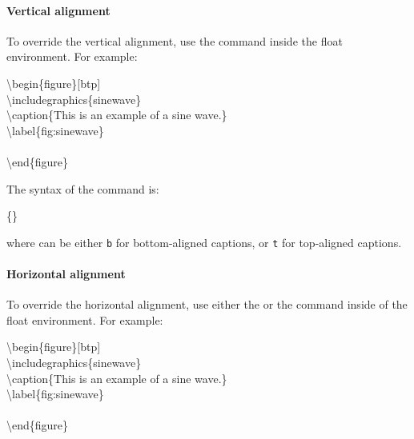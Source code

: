 \paragraph{Vertical alignment} To override the vertical alignment, use the
 command inside the float environment.  For
example:

\begin{fullwidth}
\begin{docspec}
  \textbackslash begin\{figure\}[btp]\\
  \qquad \textbackslash includegraphics\{sinewave\}\\
  \qquad \textbackslash caption\{This is an example of a sine wave.\}\\
  \qquad \textbackslash label\{fig:sinewave\}\\
  \qquad {}\\
  \textbackslash end\{figure\}
\end{docspec}
\end{fullwidth}

\noindent The syntax of the  command is:

\begin{docspec}
  \{\}
\end{docspec}

\noindent where  can be either \texttt{b} for bottom-aligned
captions, or \texttt{t} for top-aligned captions.

\paragraph{Horizontal alignment}\label{par:overriding-horizontal}
To override the horizontal alignment, use either the 
or the  command inside of the float environment.  For
example:

\begin{fullwidth}
\begin{docspec}
  \textbackslash begin\{figure\}[btp]\\
  \qquad \textbackslash includegraphics\{sinewave\}\\
  \qquad \textbackslash caption\{This is an example of a sine wave.\}\\
  \qquad \textbackslash label\{fig:sinewave\}\\
  \qquad {}\\
  \textbackslash end\{figure\}
\end{docspec}
\end{fullwidth}


